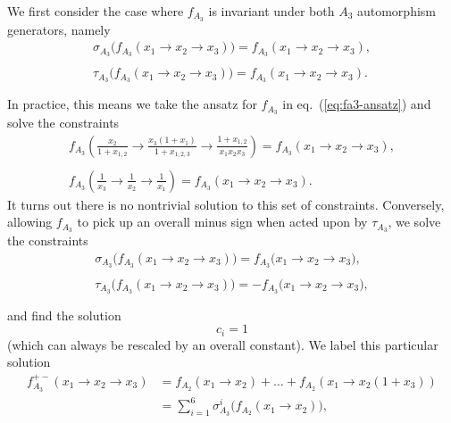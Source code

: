 \documentclass[12pt]{article}
\begin{document}
We first consider the case where $f_{A_3}$ is invariant under both $A_3$ automorphism generators, namely
\begin{equation}\label{eq:fA3++}
\begin{gathered}
	\sigma_{A_3}\big(f_{A_3} (x_1 \to x_2\to x_3) \big) = f_{A_3}(x_1 \to x_2\to x_3),\\ \\[-1.2em]
	\tau_{A_3}\big(f_{A_3} (x_1 \to x_2\to x_3) \big) = f_{A_3}(x_1 \to x_2\to x_3). \\ \\[-1.4em]
\end{gathered}
\end{equation}
In practice, this means we take the ansatz for $f_{A_3}$ in eq.~(\ref{eq:fa3-ansatz}) and solve the constraints
\begin{equation}
\begin{gathered}
	f_{A_3}\left(\frac{x_2}{1+ x_{1,2}}\to \frac{x_3(1+x_1)}{1+x_{1,2,3}}\to \frac{1+x_{1,2}}{x_1x_2x_3}\right) = f_{A_3}(x_1\to x_2\to x_3),\\ \\[-1.4em]
	f_{A_3}\left(\frac{1}{x_3} \to \frac{1}{x_2} \to \frac{1}{x_1}\right) = f_{A_3}(x_1\to x_2\to x_3).  
\end{gathered}
\end{equation}
It turns out there is no nontrivial solution to this set of constraints. Conversely, allowing $f_{A_3}$ to pick up an overall minus sign when acted upon by $\tau_{A_3}$, we solve the constraints
\begin{equation}
\begin{gathered}
	\sigma_{A_3}\big(f_{A_3}(x_1\to x_2\to x_3)\big) = f_{A_3}\big(x_1\to x_2\to x_3 \big),\\ \\[-1.2em]
	 \tau_{A_3}\big(f_{A_3}(x_1\to x_2\to x_3)\big) = -f_{A_3}\big(x_1\to x_2\to x_3 \big),  \\ \\[-1.4em]
\end{gathered}
\end{equation}
and find the solution 
\begin{equation}
	c_i = 1
\end{equation}
(which can always be rescaled by an overall constant). We label this particular solution
\begin{align}
	f_{A_3}^{+-}(x_1\to x_2\to x_3) &= f_{A_2}(x_1 \to x_2) + \ldots + f_{A_2}(x_1\to x_2 \left(1+x_3\right)) \nonumber \\
	&= \sum_{i=1}^6 \sigma_{A_3}^i\big(f_{A_2}(x_1\to x_2)\big),
\end{align}
\end{document}
